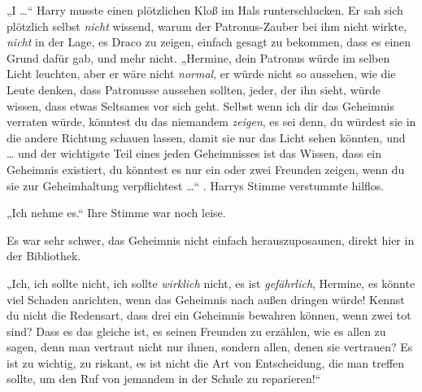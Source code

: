 „I …“ Harry musste einen plötzlichen Kloß im Hals runterschlucken. Er sah sich plötzlich selbst \emph{nicht} wissend, warum der Patronus-Zauber bei ihm nicht wirkte, \emph{nicht} in der Lage, es Draco zu zeigen, einfach gesagt zu bekommen, dass es einen Grund dafür gab, und mehr nicht.
„Hermine, dein Patronus würde im selben Licht leuchten, aber er wäre nicht \emph{normal}, er würde nicht so aussehen, wie die Leute denken, dass Patronusse aussehen sollten, jeder, der ihn sieht, würde wissen, dass etwas Seltsames vor sich geht. Selbst wenn ich dir das Geheimnis verraten würde, könntest du das niemandem \emph{zeigen}, es sei denn, du würdest sie in die andere Richtung schauen lassen, damit sie nur das Licht sehen könnten, und … und der wichtigste Teil eines jeden Geheimnisses ist das Wissen, dass ein Geheimnis existiert, du könntest es nur ein oder zwei Freunden zeigen, wenn du sie zur Geheimhaltung verpflichtest …“ . Harrys Stimme verstummte hilflos.

„Ich nehme es.“ Ihre Stimme war noch leise.

Es war sehr schwer, das Geheimnis nicht einfach herauszuposaunen, direkt hier in der Bibliothek.

„Ich, ich sollte nicht, ich sollte \emph{wirklich} nicht, es ist \emph{gefährlich}, Hermine, es könnte viel Schaden anrichten, wenn das Geheimnis nach außen dringen würde! Kennst du nicht die Redensart, dass drei ein Geheimnis bewahren können, wenn zwei tot sind? Dass es das gleiche ist, es seinen Freunden zu erzählen, wie es allen zu sagen, denn man vertraut nicht nur ihnen, sondern allen, denen sie vertrauen? Es ist zu wichtig, zu riskant, es ist nicht die Art von Entscheidung, die man treffen sollte, um den Ruf von jemandem in der Schule zu reparieren!“

